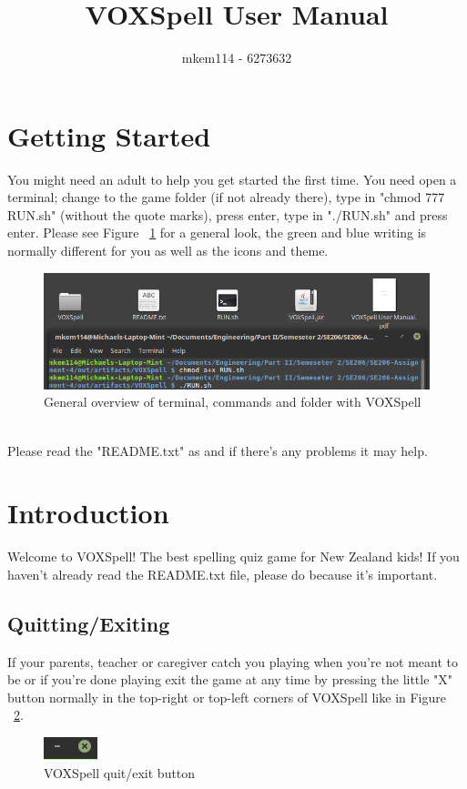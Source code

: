 \documentclass[12pt,a4paper,titlepage,onecolumn]{article}
\author{mkem114 - 6273632}
\title{VOXSpell User Manual}
\begin{document}
	\maketitle
	\tableofcontents
	\listoffigures
	
	\section{Getting Started}
	You might need an adult to help you get started the first time. You need open a terminal; change to the game folder (if not already there), type in "chmod 777 RUN.sh" (without the quote marks), press enter, type in "./RUN.sh" and press enter. Please see Figure ~\ref{fig:TerminalandFolder} for a general look, the green and blue writing is normally different for you as well as the icons and theme.
	\begin{figure}[h]
		\centering
		\includegraphics[width=1\linewidth]{"Figures/Getting Started/TerminalandFolder"}
		\caption[Terminal commands]{General overview of terminal, commands and folder with VOXSpell}
		\label{fig:TerminalandFolder}
	\end{figure}\\
	Please read the "README.txt" as and if there's any problems it may help.
	
	\section{Introduction}
	Welcome to VOXSpell! The best spelling quiz game for New Zealand kids! If you haven't already read the README.txt file, please do because it's important.\\
	\subsection{Quitting/Exiting}
	If your parents, teacher or caregiver catch you playing when you're not meant to be or if you're done playing exit the game at any time by pressing the little "X" button normally in the top-right or top-left corners of VOXSpell like in Figure ~\ref{fig:Exit}.
	\begin{figure}[h]
		\centering
		\includegraphics[width=0.1\linewidth]{Figures/Introduction/Exit}
		\caption[Quit/Exit]{VOXSpell quit/exit button}
		\label{fig:Exit}
	\end{figure}
\end{document}
